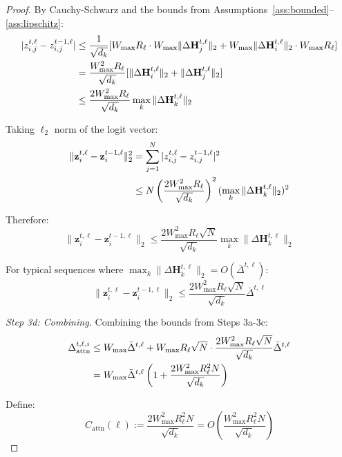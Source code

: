 \documentclass{article} %
\theoremstyle{definition}
\theoremstyle{remark}
\begin{document}
\begin{proof}
By Cauchy-Schwarz and the bounds from Assumptions~\ref{ass:bounded}--\ref{ass:lipschitz}:
\begin{align}
|z^{t,\ell}_{i,j} - z^{t-1,\ell}_{i,j}| &\leq \frac{1}{\sqrt{d_k}}[W_{\max} R_\ell \cdot W_{\max} \|\Delta\mathbf{H}^{t,\ell}_j\|_2 + W_{\max} \|\Delta\mathbf{H}^{t,\ell}_i\|_2 \cdot W_{\max} R_\ell]\notag\\
&= \frac{W_{\max}^2 R_\ell}{\sqrt{d_k}}[\|\Delta\mathbf{H}^{t,\ell}_i\|_2 + \|\Delta\mathbf{H}^{t,\ell}_j\|_2]\notag\\
&\leq \frac{2W_{\max}^2 R_\ell}{\sqrt{d_k}}\max_k \|\Delta\mathbf{H}^{t,\ell}_k\|_2
\end{align}

Taking $\ell_2$ norm of the logit vector:
\begin{align}
\|\mathbf{z}^{t,\ell}_i - \mathbf{z}^{t-1,\ell}_i\|_2^2 &= \sum_{j=1}^N |z^{t,\ell}_{i,j} - z^{t-1,\ell}_{i,j}|^2\notag\\
&\leq N \left(\frac{2W_{\max}^2 R_\ell}{\sqrt{d_k}}\right)^2 (\max_k \|\Delta\mathbf{H}^{t,\ell}_k\|_2)^2
\end{align}

Therefore:
\begin{equation}
\|\mathbf{z}^{t,\ell}_i - \mathbf{z}^{t-1,\ell}_i\|_2 \leq \frac{2W_{\max}^2 R_\ell \sqrt{N}}{\sqrt{d_k}} \max_k \|\Delta\mathbf{H}^{t,\ell}_k\|_2
\end{equation}

For typical sequences where $\max_k \|\Delta\mathbf{H}^{t,\ell}_k\|_2 = O(\bar{\Delta}^{t,\ell})$:
\begin{equation}
\|\mathbf{z}^{t,\ell}_i - \mathbf{z}^{t-1,\ell}_i\|_2 \leq \frac{2W_{\max}^2 R_\ell \sqrt{N}}{\sqrt{d_k}} \bar{\Delta}^{t,\ell}
\end{equation}

\textit{Step 3d: Combining.}
Combining the bounds from Steps 3a-3c:
\begin{align}
\Delta_{\text{attn}}^{t,\ell,i} &\leq W_{\max} \bar{\Delta}^{t,\ell} + W_{\max} R_\ell \sqrt{N} \cdot \frac{2W_{\max}^2 R_\ell \sqrt{N}}{\sqrt{d_k}} \bar{\Delta}^{t,\ell}\notag\\
&= W_{\max} \bar{\Delta}^{t,\ell} \left(1 + \frac{2W_{\max}^2 R_\ell^2 N}{\sqrt{d_k}}\right)
\end{align}

Define:
\begin{equation}
C_{\text{attn}}(\ell) := \frac{2W_{\max}^2 R_\ell^2 N}{\sqrt{d_k}} = O\left(\frac{W_{\max}^2 R_\ell^2 N}{\sqrt{d_k}}\right)
\end{equation}


\end{proof}
\end{document}

